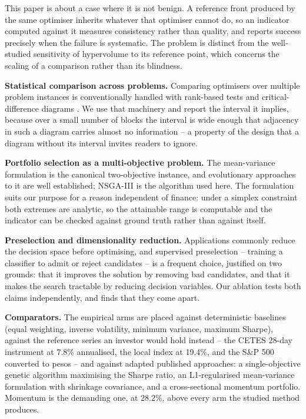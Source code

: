 \documentclass[preprint,11pt,authoryear]{elsarticle}
\begin{document}
This paper is about a case where it is not benign. A reference front produced by the same optimiser inherits whatever that optimiser cannot do, so an indicator computed against it measures consistency rather than quality, and reports success precisely when the failure is systematic. The problem is distinct from the well-studied sensitivity of hypervolume to its reference point, which concerns the scaling of a comparison rather than its blindness.

\textbf{Statistical comparison across problems.} Comparing optimisers over multiple problem instances is conventionally handled with rank-based tests and critical-difference diagrams \citep{demsar2006}. We use that machinery and report the interval it implies, because over a small number of blocks the interval is wide enough that adjacency in such a diagram carries almost no information -- a property of the design that a diagram without its interval invites readers to ignore.

\textbf{Portfolio selection as a multi-objective problem.} The mean-variance formulation \citep{markowitz1952} is the canonical two-objective instance, and evolutionary approaches to it are well established; NSGA-III \citep{deb2014} is the algorithm used here. The formulation suits our purpose for a reason independent of finance: under a simplex constraint both extremes are analytic, so the attainable range is computable and the indicator can be checked against ground truth rather than against itself.

\textbf{Preselection and dimensionality reduction.} Applications commonly reduce the decision space before optimising, and supervised preselection -- training a classifier to admit or reject candidates -- is a frequent choice, justified on two grounds: that it improves the solution by removing bad candidates, and that it makes the search tractable by reducing decision variables. Our ablation tests both claims independently, and finds that they come apart.

\textbf{Comparators.} The empirical arms are placed against deterministic baselines (equal weighting, inverse volatility, minimum variance, maximum Sharpe), against the reference series an investor would hold instead -- the CETES 28-day instrument at 7.8\% annualised, the local index at 19.4\%, and the S\&P 500 converted to pesos -- and against adapted published approaches: a single-objective genetic algorithm maximising the Sharpe ratio, an L1-regularised mean-variance formulation with shrinkage covariance, and a cross-sectional momentum portfolio. Momentum is the demanding one, at 28.2\%, above every arm the studied method produces.
\end{document}

